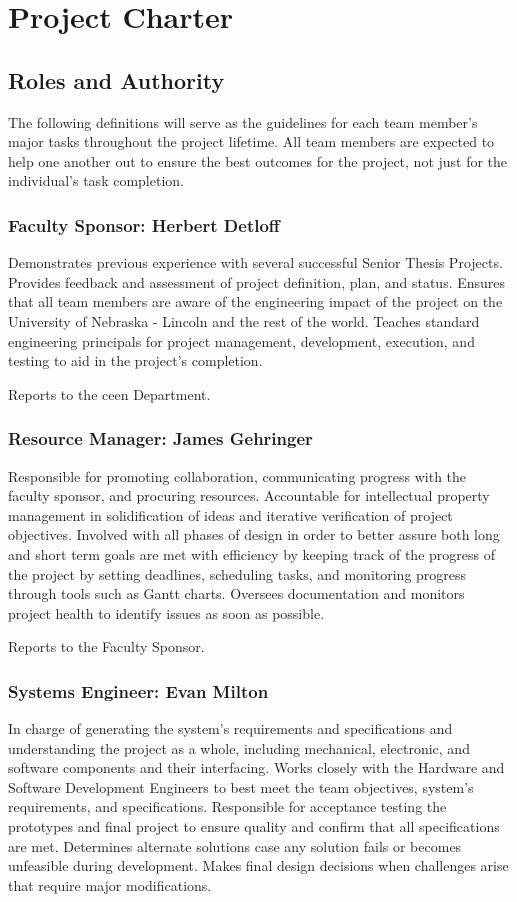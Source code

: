 \chapter{Project Charter}

\section{Roles and Authority}
The following definitions will serve as the guidelines for each team member's major tasks throughout the project lifetime. 
All team members are expected to help one another out to ensure the best outcomes for the project, not just for the individual's task completion.

\subsection{Faculty Sponsor: Herbert Detloff}
Demonstrates previous experience with several successful Senior Thesis Projects.
Provides feedback and assessment of project definition, plan, and status.
Ensures that all team members are aware of the engineering impact of the project on the University of Nebraska - Lincoln and the rest of the world.
Teaches standard engineering principals for project management, development, execution, and testing to aid in the project's completion.

Reports to the \gls{ceen} Department.

\subsection{Resource Manager: James Gehringer}
Responsible for promoting collaboration, communicating progress with the faculty sponsor, and procuring resources.
Accountable for intellectual property management in solidification of ideas and iterative verification of project objectives.
Involved with all phases of design in order to better assure both long and short term goals are met with efficiency by keeping track of the progress of the project by setting deadlines, scheduling tasks, and monitoring progress through tools such as Gantt charts.
Oversees documentation and monitors project health to identify issues as soon as possible.

Reports to the Faculty Sponsor. 

\subsection{Systems Engineer: Evan Milton}
In charge of generating the system's requirements and specifications and understanding the project as a whole, including mechanical, electronic, and software components and their interfacing.
Works closely with the Hardware and Software Development Engineers to best meet the team objectives, system's requirements, and specifications.
Responsible for acceptance testing the prototypes and final project to ensure quality and confirm that all specifications are met.
Determines alternate solutions case any solution fails or becomes unfeasible during development.
Makes final design decisions when challenges arise that require major modifications.

